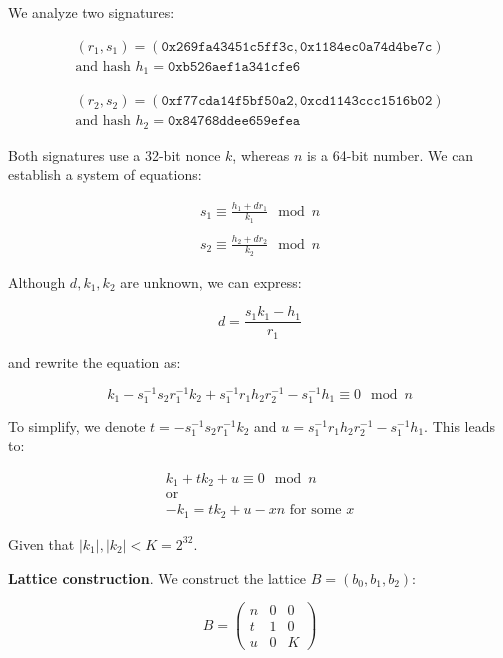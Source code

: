 \documentclass[a4paper,12pt]{report}
\begin{document}
We analyze two signatures:

\[
    \begin{array}{c}
        (r_1, s_1) = (\texttt{0x269fa43451c5ff3c}, \texttt{0x1184ec0a74d4be7c}) \\
        \text{and hash } h_1 = \texttt{0xb526aef1a341cfe6}
    \end{array}
\]

\[
    \begin{array}{c}
        (r_2, s_2) = (\texttt{0xf77cda14f5bf50a2}, \texttt{0xcd1143ccc1516b02}) \\ 
        \text{and hash } h_2 = \texttt{0x84768ddee659efea}
    \end{array}
\]

Both signatures use a 32-bit nonce $k$, whereas $n$ is a 64-bit number. We can establish a system of equations:

\[
    \begin{array}{c}
        s_1 \equiv \displaystyle\frac{h_1 + dr_1}{k_1} \mod n \\ \\ 
        s_2 \equiv \displaystyle\frac{h_2 + dr_2}{k_2} \mod n
    \end{array}
\]

Although $d, k_1, k_2$ are unknown, we can express:

\[
    d = \displaystyle\frac{s_1k_1 - h_1}{r_1}
\]

and rewrite the equation as:

\[
    k_1 - s_1^{-1}s_2r_1^{-1}k_2 + s_1^{-1}r_1h_2r_2^{-1} - s_1^{-1}h_1 \equiv 0 \mod n
\]

To simplify, we denote $t = - s_1^{-1}s_2r_1^{-1}k_2$ and $u = s_1^{-1}r_1h_2r_2^{-1} - s_1^{-1}h_1$. This leads to:

\[
    \begin{array}{c}
        k_1 + tk_2 + u \equiv 0 \mod n \\
        \text{or} \\
        -k_1 = tk_2 + u - xn \text{   for some $x$}
    \end{array}
\]

Given that $|k_1|, |k_2| < K = 2^{32}$.

\vspace*{10px}

\textbf{Lattice construction}. We construct the lattice $B = (b_0, b_1, b_2)$:

\[
    B = 
    \begin{pmatrix}
        n & 0 & 0 \\
        t & 1 & 0 \\
        u & 0 & K
    \end{pmatrix}
\]
\end{document}
